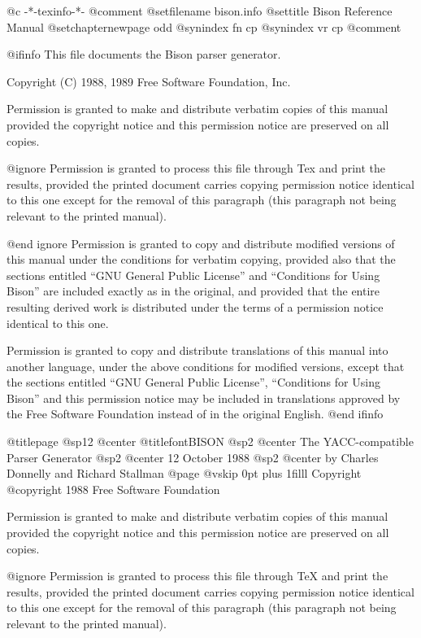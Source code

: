  @c -*-texinfo-*-
@comment %
@setfilename bison.info
@settitle Bison Reference Manual
@setchapternewpage odd
@synindex fn cp
@synindex vr cp
@comment %

@ifinfo
This file documents the Bison parser generator.

Copyright (C) 1988, 1989 Free Software Foundation, Inc.

Permission is granted to make and distribute verbatim copies of
this manual provided the copyright notice and this permission notice
are preserved on all copies.

@ignore
Permission is granted to process this file through Tex and print the
results, provided the printed document carries copying permission
notice identical to this one except for the removal of this paragraph
(this paragraph not being relevant to the printed manual).

@end ignore
Permission is granted to copy and distribute modified versions of this
manual under the conditions for verbatim copying, provided also that the
sections entitled ``GNU General Public License'' and ``Conditions for
Using Bison'' are included exactly as in the original, and provided that
the entire resulting derived work is distributed under the terms of a
permission notice identical to this one.

Permission is granted to copy and distribute translations of this manual
into another language, under the above conditions for modified versions,
except that the sections entitled ``GNU General Public License'',
``Conditions for Using Bison'' and this permission notice may be
included in translations approved by the Free Software Foundation
instead of in the original English.
@end ifinfo

@titlepage
@sp12
@center @titlefont{BISON}
@sp2
@center The YACC-compatible Parser Generator
@sp2
@center 12 October 1988
@sp2
@center by Charles Donnelly and Richard Stallman
@page
@vskip 0pt plus 1filll
Copyright @copyright{} 1988 Free Software Foundation

Permission is granted to make and distribute verbatim copies of
this manual provided the copyright notice and this permission notice
are preserved on all copies.

@ignore
Permission is granted to process this file through TeX and print the
results, provided the printed document carries copying permission
notice identical to this one except for the removal of this paragraph
(this paragraph not being relevant to the printed manual).

